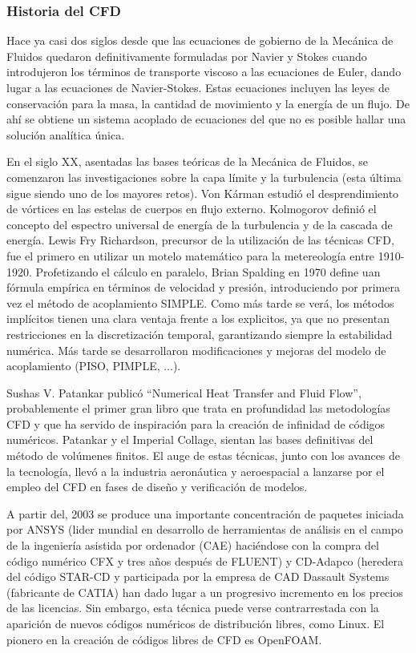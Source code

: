 \subsubsection{Historia del CFD}\label{header-n15}

Hace ya casi dos siglos desde que las ecuaciones de gobierno de la
Mecánica de Fluidos quedaron definitivamente formuladas por Navier y
Stokes cuando introdujeron los términos de transporte viscoso a las
ecuaciones de Euler, dando lugar a las ecuaciones de Navier-Stokes.
Estas ecuaciones incluyen las leyes de conservación para la masa, la
cantidad de movimiento y la energía de un flujo. De ahí se obtiene un
sistema acoplado de ecuaciones del que no es posible hallar una solución
analítica única.

En el siglo XX, asentadas las bases teóricas de la Mecánica de Fluidos,
se comenzaron las investigaciones sobre la capa límite y la turbulencia
(esta última sigue siendo uno de los mayores retos). Von Kárman estudió
el desprendimiento de vórtices en las estelas de cuerpos en flujo
externo. Kolmogorov definió el concepto del espectro universal de
energía de la turbulencia y de la cascada de energía. Lewis Fry
Richardson, precursor de la utilización de las técnicas CFD, fue el
primero en utilizar un motelo matemático para la metereología entre
1910-1920. Profetizando el cálculo en paralelo, Brian Spalding en 1970
define uan fórmula empírica en términos de velocidad y presión,
introduciendo por primera vez el método de acoplamiento SIMPLE. Como más
tarde se verá, los métodos implícitos tienen una clara ventaja frente a
los explicitos, ya que no presentan restricciones en la discretización
temporal, garantizando siempre la estabilidad numérica. Más tarde se
desarrollaron modificaciones y mejoras del modelo de acoplamiento (PISO,
PIMPLE, ...).

Sushas V. Patankar publicó ``Numerical Heat Transfer and Fluid Flow'',
probablemente el primer gran libro que trata en profundidad las
metodologías CFD y que ha servido de inspiración para la creación de
infinidad de códigos numéricos. Patankar y el Imperial Collage, sientan
las bases definitivas del método de volúmenes finitos. El auge de estas
técnicas, junto con los avances de la tecnología, llevó a la industria
aeronáutica y aeroespacial a lanzarse por el empleo del CFD en fases de
diseño y verificación de modelos.

A partir del, 2003 se produce una importante concentración de paquetes
iniciada por ANSYS (lider mundial en desarrollo de herramientas de
análisis en el campo de la ingeniería asistida por ordenador (CAE)
haciéndose con la compra del código numérico CFX y tres años después de
FLUENT) y CD-Adapco (heredera del código STAR-CD y participada por la
empresa de CAD Dassault Systems (fabricante de CATIA) han dado lugar a
un progresivo incremento en los precios de las licencias. Sin embargo,
esta técnica puede verse contrarrestada con la aparición de nuevos
códigos numéricos de distribución libres, como Linux. El pionero en la
creación de códigos libres de CFD es OpenFOAM.

